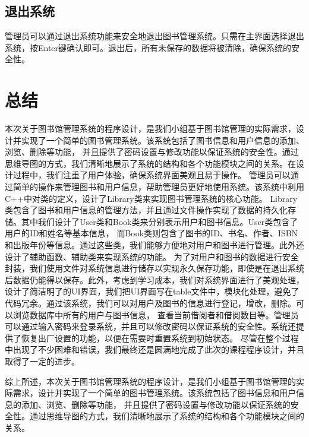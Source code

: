 \documentclass{article}
\begin{document}
\subsection{退出系统}
管理员可以通过退出系统功能来安全地退出图书管理系统。只需在主界面选择退出系统，按Enter键确认即可。退出后，所有未保存的数据将被清除，确保系统的安全性。

\section{总结}

本次关于图书馆管理系统的程序设计，是我们小组基于图书馆管理的实际需求，设计并实现了一个简单的图书管理系统。该系统包括了图书信息和用户信息的添加、浏览、删除等功能，
并且提供了密码设置与修改功能以保证系统的安全性。通过思维导图的方式，我们清晰地展示了系统的结构和各个功能模块之间的关系。在设计过程中，我们注重了用户体验，确保系统界面美观且易于操作。
管理员可以通过简单的操作来管理图书和用户信息，帮助管理员更好地使用系统。该系统中利用C++中对类的定义，设计了Library类来实现图书管理系统的核心功能。
Library类包含了图书和用户信息的管理方法，并且通过文件操作实现了数据的持久化存储。其中我们设计了User类和Book类来分别表示用户和图书信息。User类包含了用户的ID和姓名等基本信息，
而Book类则包含了图书的ID、书名、作者、ISBN和出版年份等信息。通过这些类，我们能够方便地对用户和图书进行管理。此外还设计了辅助函数、辅助类来实现系统的功能。
为了对用户和图书的数据进行安全封装，我们使用文件对系统信息进行储存以实现永久保存功能，即使是在退出系统后数据仍能得以保存。此外，考虑到学习成本，我们对系统界面进行了美观处理，
设计了简洁明了的UI界面，我们把UI界面写在table文件中，模块化处理，避免了代码冗余。通过该系统，我们可以对用户及图书的信息进行登记，增改，删除。可以浏览数据库中所有的用户与图书信息，
查看当前借阅者和借阅数目等。管理员可以通过输入密码来登录系统，并且可以修改密码以保证系统的安全性。系统还提供了恢复出厂设置的功能，以便在需要时重置系统到初始状态。
尽管在整个过程中出现了不少困难和错误，我们最终还是圆满地完成了此次的课程程序设计，并且取得了一定的进步。

综上所述，本次关于图书馆管理系统的程序设计，是我们小组基于图书馆管理的实际需求，设计并实现了一个简单的图书管理系统。该系统包括了图书信息和用户信息的添加、浏览、删除等功能，
并且提供了密码设置与修改功能以保证系统的安全性。通过思维导图的方式，我们清晰地展示了系统的结构和各个功能模块之间的关系。
\end{document}
